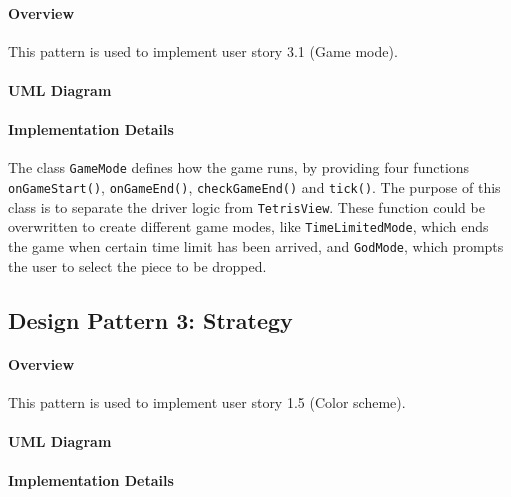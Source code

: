\documentclass{article}
\begin{document}
\paragraph{Overview}
This pattern is used to implement user story 3.1 (Game mode).

\paragraph{UML Diagram}\hfill

\begin{figure}[H]
    
\end{figure}

\paragraph{Implementation Details}

The class \verb`GameMode` defines how the game runs, by providing four functions \verb`onGameStart()`, \verb`onGameEnd()`, \verb`checkGameEnd()` and \verb`tick()`. The purpose of this class is to separate the driver logic from \verb`TetrisView`. These function could be overwritten to create different game modes, like \verb`TimeLimitedMode`, which ends the game when certain time limit has been arrived, and \verb`GodMode`, which prompts the user to select the piece to be dropped.

\clearpage

\subsection{Design Pattern 3: Strategy}

\paragraph{Overview}
This pattern is used to implement user story 1.5 (Color scheme).

\paragraph{UML Diagram}\hfill

\begin{figure}[H]
    
\end{figure}

\paragraph{Implementation Details}
\end{document}
